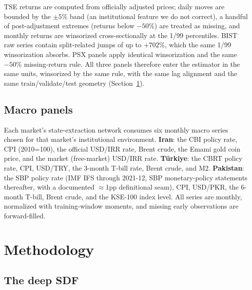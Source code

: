 \documentclass[12pt]{article}
\begin{document}
TSE returns are computed from officially adjusted prices; daily moves are bounded by the $\pm5\%$ band (an institutional feature we do not correct), a handful of post-adjustment extremes (returns below $-50\%$) are treated as missing, and monthly returns are winsorized cross-sectionally at the 1/99 percentiles. BIST raw series contain split-related jumps of up to $+702\%$, which the same 1/99 winsorization absorbs. PSX panels apply identical winsorization and the same $-50\%$ missing-return rule. All three panels therefore enter the estimator in the same units, winsorized by the same rule, with the same lag alignment and the same train/validate/test geometry (Section~\ref{sec:method}).

\subsection{Macro panels}

Each market's state-extraction network consumes six monthly macro series chosen for that market's institutional environment. \textbf{Iran}: the CBI policy rate, CPI (2010=100), the official USD/IRR rate, Brent crude, the Emami gold coin price, and the market (free-market) USD/IRR rate. \textbf{T\"urkiye}: the CBRT policy rate, CPI, USD/TRY, the 3-month T-bill rate, Brent crude, and M2. \textbf{Pakistan}: the SBP policy rate (IMF IFS through 2021-12, SBP monetary-policy statements thereafter, with a documented $\approx$1pp definitional seam), CPI, USD/PKR, the 6-month T-bill, Brent crude, and the KSE-100 index level. All series are monthly, normalized with training-window moments, and missing early observations are forward-filled.

\section{Methodology}\label{sec:method}

\subsection{The deep SDF}
\end{document}
